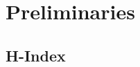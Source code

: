 \documentclass[conference]{IEEEtran}
\begin{document}



\section{Preliminaries}\label{prelim}




\subsection{H-Index}\label{hindex}
\end{document}
